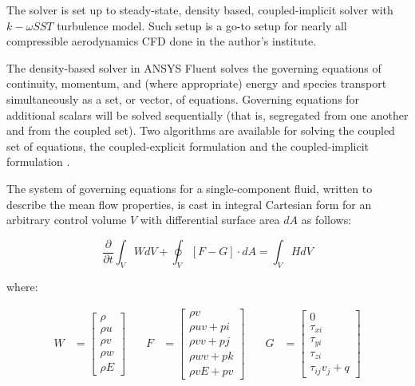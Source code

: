 The solver is set up to steady-state, density based, coupled-implicit solver with $k-\omega SST$ turbulence model. Such setup is a go-to setup for nearly all compressible aerodynamics CFD done in the author's institute.

The density-based solver in ANSYS Fluent solves the governing equations of continuity, momentum, and (where appropriate) energy and species transport simultaneously as a set, or vector, of equations. Governing equations for additional scalars will be solved sequentially (that is, segregated from one another and from the coupled set). Two algorithms are available for solving the coupled set of equations, the coupled-explicit formulation and the coupled-implicit formulation \citep{fluenttheory}.

The system of governing equations for a single-component fluid, written to describe the mean flow properties, is cast in integral Cartesian form for an arbitrary control volume $V$ with differential surface area $dA$ as follows:

\begin{equation} \label{eq:densitybased}
\frac{\partial}{\partial t} \int_V WdV + \oint_V \left[ F-G \right] \cdot dA = \int_V HdV
\end{equation}

\noindent where:

\begin{equation} \label{eq:desityvectors}
\begin{aligned}
	W &= \begin{bmatrix}
		\rho \\
		\rho u \\
		\rho v \\
		\rho w \\
		\rho E
	\end{bmatrix}
\end{aligned} \quad
\begin{aligned}
	F &= \begin{bmatrix}
		\rho v\\
		\rho uv + pi\\
		\rho vv + pj\\
		\rho wv + pk\\
		\rho vE + pv
	\end{bmatrix}
\end{aligned} \quad
\begin{aligned}
	G &= \begin{bmatrix}
		0 \\
		\tau_{xi} \\
		\tau_{yi} \\
		\tau_{zi} \\
		\tau_{ij} v_j + q
	\end{bmatrix}
\end{aligned}
\end{equation}

